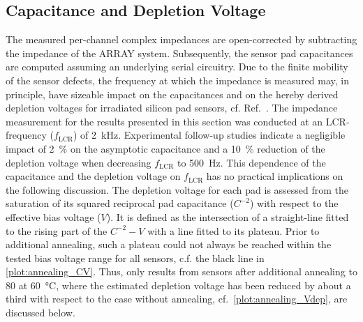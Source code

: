 \subsection{Capacitance and Depletion Voltage}
\label{subsec:Udep}

The measured per-channel complex impedances are open-corrected by subtracting the impedance of the ARRAY system.
Subsequently, the sensor pad capacitances are computed assuming an underlying serial circuitry.
Due to the finite mobility of the sensor defects, the frequency at which the impedance is measured may, in principle, have sizeable impact on the capacitances and on the hereby derived depletion voltages for irradiated silicon pad sensors, cf. Ref.~\cite{Li1991}.
The impedance measurement for the results presented in this section was conducted at an LCR-frequency ($f_\text{LCR}$) of \SI{2}{\kilo\hertz}.
Experimental follow-up studies indicate a negligible impact of \SI{2}{\percent} on the asymptotic capacitance and a \SI{10}{\percent} reduction of the depletion voltage when decreasing $f_\text{LCR}$ to \SI{500}{\hertz}.
This dependence of the capacitance and the depletion voltage on $f_\text{LCR}$ has no practical implications on the following discussion.
The depletion voltage for each pad is assessed from the saturation of its squared reciprocal pad capacitance ($C^{-2}$) with respect to the effective bias voltage ($V$). 
It is defined as the intersection of a straight-line fitted to the rising part of the $C^{-2}-V$ with a line fitted to its plateau.
Prior to additional annealing, such a plateau could not always be reached within the tested bias voltage range for all sensors, c.f. the black line in \ref{plot:annealing_CV}. 
Thus, only results from sensors after additional annealing to \SI{80}{\min} at \SI{60}{\celsius}, where the estimated depletion voltage has been reduced by about a third with respect to the case without annealing, cf.~\ref{plot:annealing_Vdep}, are discussed below. 

